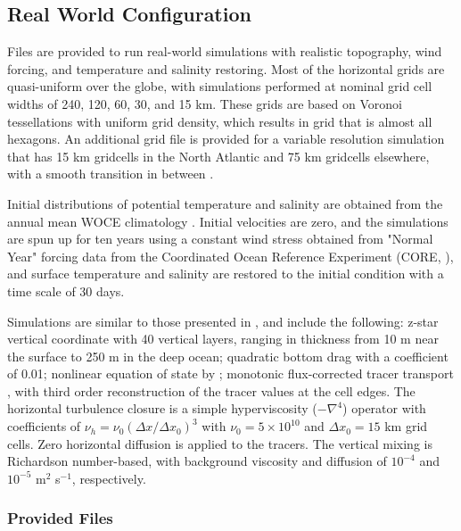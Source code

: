\subsection{Real World Configuration}
\label{subsec:realWorld_description}

Files are provided to run real-world simulations with realistic topography, wind forcing, and temperature and salinity restoring.  
Most of the horizontal grids are quasi-uniform over the globe, with simulations performed at nominal grid cell widths of 240, 120, 60, 30, and 15 km.  These grids are based on Voronoi tessellations with uniform grid density, which results in grid that is almost all hexagons.  An additional grid file is provided for a variable resolution simulation that has 15 km gridcells in the North Atlantic and 75 km gridcells elsewhere, with a smooth transition in between \citep[Figure 2]{Ringler_ea13om}.

Initial distributions of potential temperature and salinity are obtained from the annual mean WOCE climatology \citep{Gouretski:2004wv}.  Initial velocities are zero, and the simulations are spun up for ten years using a constant wind stress obtained from "Normal Year" forcing data from the Coordinated Ocean Reference Experiment (CORE, \citet{Large:2004ug}), and surface temperature and salinity are restored to the initial condition with a time scale of 30 days.  

Simulations are similar to those presented in \citet{Ringler_ea13om}, and include the following: z-star vertical coordinate with 40 vertical layers, ranging in thickness from 10 m near the surface to 250 m in the deep ocean; quadratic bottom drag with a coefficient of 0.01; nonlinear equation of state by \citet{Jackett_McDougall95jaot}; monotonic flux-corrected tracer transport \citep{Skamarock_Gassmann11jcp}, with third order reconstruction of the tracer values at the cell edges.  The horizontal turbulence closure is a simple hyperviscosity ($-\nabla^4$) operator with coefficients of $\nu_h = \nu_0 (\Delta x / \Delta x_0)^3$ with $\nu_0=5\times10^{10}$ and $\Delta x_0=15$ km grid cells.  Zero horizontal diffusion is applied to the tracers.  The vertical mixing is Richardson number-based, with background viscosity and diffusion of $10^{-4}$ and $10^{-5}$ m$^2$ s$^{-1}$, respectively.


\subsubsection{Provided Files}
\label{subsubsec:realWorld_files}

